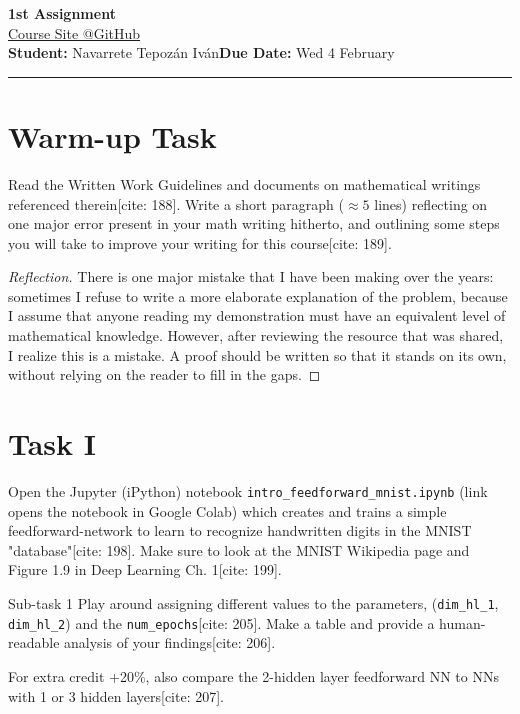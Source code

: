 \documentclass[12pt]{article}
\newcommand{\courseURL}{https://eduenez.github.io/MathAIspring2026UTSA}
\newcommand{\assignmentTitle}{1st Assignment}
\newcommand{\studentName}{Navarrete Tepozán Iván}
\begin{document}
\begin{center}
    {\LARGE \textbf{\assignmentTitle}} \\
    \vspace{5pt}
    {\large \href{\courseURL}{Course Site @GitHub}} \\
    \vspace{10pt}
    \textbf{Student:} \studentName \hfill \textbf{Due Date:} {Wed 4 February}\\
    \rule{\linewidth}{0.4pt}
\end{center}

\section*{Warm-up Task}
\begin{problem}{}
Read the Written Work Guidelines and documents on mathematical writings referenced therein[cite: 188]. Write a short paragraph ($\approx 5$ lines) reflecting on one major error present in your math writing hitherto, and outlining some steps you will take to improve your writing for this course[cite: 189].
\end{problem}

\begin{proof}[Reflection]
There is one major mistake that I have been making over the years: sometimes I refuse to write a more elaborate explanation of the problem, because I assume that anyone reading my demonstration must have an equivalent level of mathematical knowledge. However, after reviewing the resource that was shared, I realize this is a mistake. A proof should be written so that it stands on its own, without relying on the reader to fill in the gaps.
\end{proof}

\section*{Task I}
Open the Jupyter (iPython) notebook \texttt{intro\_feedforward\_mnist.ipynb} (link opens the notebook in Google Colab) which creates and trains a simple feedforward-network to learn to recognize handwritten digits in the MNIST "database"[cite: 198]. Make sure to look at the MNIST Wikipedia page and Figure 1.9 in Deep Learning Ch. 1[cite: 199].

\begin{problem}{Sub-task 1}
Play around assigning different values to the parameters, (\texttt{dim\_hl\_1}, \texttt{dim\_hl\_2}) and the \texttt{num\_epochs}[cite: 205]. Make a table and provide a human-readable analysis of your findings[cite: 206]. 

For extra credit +20\%, also compare the 2-hidden layer feedforward NN to NNs with 1 or 3 hidden layers[cite: 207].
\end{problem}
\end{document}
